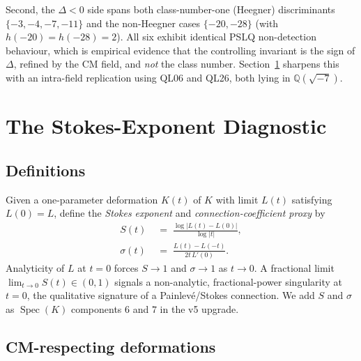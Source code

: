 \documentclass[11pt,reqno]{amsart}
\theoremstyle{definition}
\DeclareMathOperator{\Spec}{Spec}
\begin{document}
Second, the $\Delta<0$ side spans both class-number-one
(Heegner) discriminants
$\{-3,-4,-7,-11\}$ and the non-Heegner cases
$\{-20,-28\}$ (with $h(-20) = h(-28) = 2$). All six exhibit
identical PSLQ non-detection behaviour, which is empirical
evidence that the controlling invariant is the sign of
$\Delta$, refined by the CM field, and \emph{not} the class
number. Section~\ref{sec:stokes} sharpens this with an
intra-field replication using QL06 and QL26, both lying in
$\mathbb{Q}(\sqrt{-7})$.

\section{The Stokes-Exponent Diagnostic}\label{sec:stokes}

\subsection{Definitions}

Given a one-parameter deformation $K(t)$ of $K$ with limit
$L(t)$ satisfying $L(0) = L$, define the
\emph{Stokes exponent} and \emph{connection-coefficient
proxy} by
\begin{align}
S(t) &\;=\; \frac{\log|L(t)-L(0)|}{\log|t|},\label{eq:S}\\
\sigma(t) &\;=\; \frac{L(t) - L(-t)}{2t\,L'(0)}.\label{eq:sigma}
\end{align}
Analyticity of $L$ at $t=0$ forces $S\to 1$ and $\sigma\to 1$
as $t\to 0$. A fractional limit
$\lim_{t\to 0} S(t) \in (0,1)$ signals a non-analytic,
fractional-power singularity at $t=0$, the qualitative
signature of a Painlev\'e/Stokes connection. We add $S$ and
$\sigma$ as $\Spec(K)$ components $6$ and $7$ in the v5
upgrade.

\subsection{CM-respecting deformations}
\end{document}
